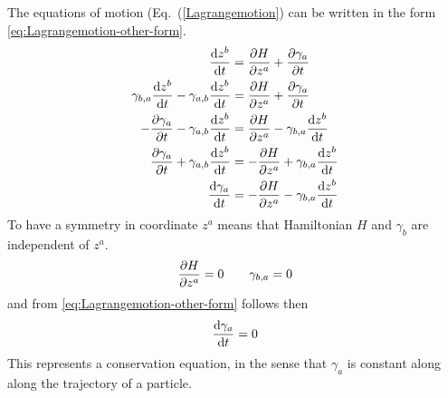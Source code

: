The equations of motion (Eq.~(\ref{Lagrangemotion}) can be written in the form \eqref{eq:Lagrangemotion-other-form}.
\begin{align} 
[ \gamma_{b,a} - \gamma_{a,b} ] \d{z^b}{ t} &= \pd{ H}{ z^a} + \pd{ \gamma_a}{ t}
\nonumber\\
\gamma_{b,a}\d{z^b}{ t} - \gamma_{a,b} \d{z^b}{ t} &= \pd{ H}{ z^a} + \pd{ \gamma_a}{ t}
\nonumber\\
 - \pd{ \gamma_a}{ t} - \gamma_{a,b} \d{z^b}{ t} &= \pd{ H}{ z^a} - \gamma_{b,a}\d{z^b}{ t}
\nonumber\\
\pd{ \gamma_a}{ t} + \gamma_{a,b} \d{z^b}{ t} &= -\pd{ H}{ z^a} + \gamma_{b,a}\d{z^b}{ t}
\nonumber\\
\d{\gamma_a}{t} &= - \pd{H}{z^a} - \gamma_{b,a} \d{z^b}{t} 
\label{eq:Lagrangemotion-other-form}
\end{align} 
To have a symmetry in coordinate $z^a$ means that Hamiltonian $H$ and $\gamma_b$ are independent of $z^a$.
\begin{equation} 
\frac{\partial H}{\partial z^a} = 0 \qquad 
\gamma_{b,a} = 0 
\end{equation} 
and from \eqref{eq:Lagrangemotion-other-form} follows then
\begin{equation} 
\frac{\mathrm{d}  \gamma_a }{\mathrm{d}  t} = 0 
\end{equation}
This represents a conservation equation, in the sense that $\gamma_a$ is constant along along the trajectory of a particle.

